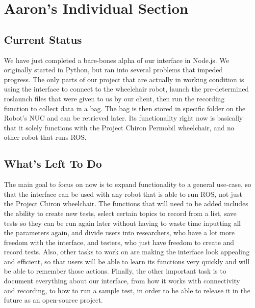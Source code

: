 \documentclass[onecolumn, draftclsnofoot,10pt, compsoc]{IEEEtran}
\begin{document}
\section{Aaron's Individual Section}

\subsection{Current Status}
We have just completed a bare-bones alpha of our interface in Node.js. We originally started in Python, but ran into several problems that impeded progress. The only parts of our project that are actually in working condition is using the interface to connect to the wheelchair robot, launch the pre-determined roslaunch files that were given to us by our client, then run the recording function to collect data in a bag. The bag is then stored in specific folder on the Robot's NUC and can be retrieved later. Its functionality right now is basically that it solely functions with the Project Chiron Permobil wheelchair, and no other robot that runs ROS.

\subsection{What's Left To Do}
The main goal to focus on now is to expand functionality to a general use-case, so that the interface can be used with any robot that is able to run ROS, not just the Project Chiron wheelchair. The functions that will need to be added includes the ability to create new tests, select certain topics to record from a list, save tests so they can be run again later without having to waste time inputting all the parameters again, and divide users into researchers, who have a lot more freedom with the interface, and testers, who just have freedom to create and record tests. Also, other tasks to work on are making the interface look appealing and efficient, so that users will be able to learn its functions very quickly and will be able to remember those actions. Finally, the other important task is to document everything about our interface, from how it works with connectivity and recording, to how to run a sample test, in order to be able to release it in the future as an open-source project.
\end{document}
